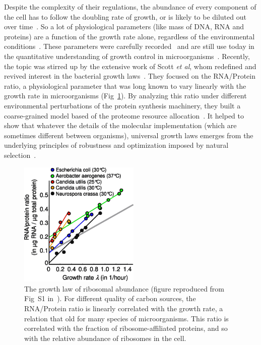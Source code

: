 Despite the complexity of their regulations, the abundance of every component of the cell has to follow the doubling rate of growth, or is likely to be diluted out over time~\cite{monod_growth_1949}.
So a lot of physiological parameters (like mass of DNA, RNA and proteins) are a function of the growth rate alone, regardless of the environmental conditions~\cite{schaechter_dependency_1958,bremer_modulation_1996}.
These parameters were carefully recorded~\cite{bremer_modulation_1996} and are still use today in the quantitative understanding of growth control in microorganisms~\cite{ehrenberg_mediumdependent_2012}.
Recently, the topic was stirred up by the extensive work of Scott \textit{et al}, whom redefined and revived interest in the bacterial growth laws~\cite{scott_bacterial_2011}.
They focused on the RNA/Protein ratio, a physiological parameter that was long known to vary linearly with the growth rate in microorganisms (Fig~\ref{fig:scott_rnaprot}).
By analyzing this ratio under different environmental perturbations of the protein synthesis machinery, they built a coarse-grained model based of the proteome resource allocation~\cite{scott_emergence_2014}.
It helped to show that whatever the details of the molecular implementation (which are sometimes different between organisms), universal growth laws emerges from the underlying principles of robustness and optimization imposed by natural selection~\cite{scott_emergence_2014}. 

\begin{figure}[!h]
\centering
\includegraphics[height=6cm]{./Fig/Chapter1/scott_rnaprot.eps}
\caption{The growth law of ribosomal abundance (figure reproduced from Fig~S1 in~\cite{scott_interdependence_2010}).
For different quality of carbon sources, the RNA/Protein ratio is linearly correlated with the growth rate, a relation that old for many species of microorganisms.
This ratio is correlated with the fraction of ribosome-affiliated proteins, and so with the relative abundance of ribosomes in the cell.
}
\label{fig:scott_rnaprot}
\end{figure}

